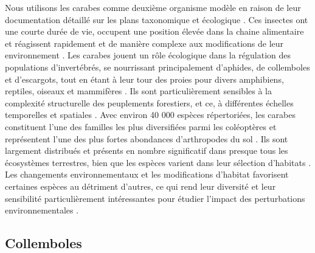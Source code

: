 Nous utilisons les carabes comme deuxième organisme modèle en raison de leur documentation détaillé sur les plans taxonomique et écologique \citep{loveiEcologyBehaviorGround1996}. 
Ces insectes ont une courte durée de vie, occupent une position élevée dans la chaine alimentaire et réagissent rapidement et de manière complexe aux modifications de leur environnement \citep{loveiEcologyBehaviorGround1996}.
Les carabes jouent un rôle écologique dans la régulation des populations d'invertébrés, se nourrissant principalement d'aphides, de collemboles et d'escargots, tout en étant à leur tour des proies pour divers amphibiens, reptiles, oiseaux et mammifères \citep{loveiEcologyBehaviorGround1996}. 
Ils sont particulièrement sensibles à la complexité structurelle des peuplements forestiers, et ce, à différentes échelles temporelles et spatiales \citep{Butterfield1995Carabidbeetle,loveiEcologyBehaviorGround1996,Niemela2007effectsforestry}.
Avec environ 40 000 espèces répertoriées, les carabes constituent l'une des familles les plus diversifiées parmi les coléoptères et représentent l'une des plus fortes abondances d'arthropodes du sol \citep{Erwin1985taxonpulse,loveiEcologyBehaviorGround1996,Rochefort2006GroundBeetle}. 
Ils sont largement distribués et présents en nombre significatif dans presque tous les écosystèmes terrestres, bien que les espèces varient dans leur sélection d'habitats \citep{loveiEcologyBehaviorGround1996,kotzeFortyYearsCarabid2011a,Larochelle2003naturalhistory}. 
Les changements environnementaux et les modifications d'habitat favorisent certaines espèces au détriment d'autres, ce qui rend leur diversité et leur sensibilité particulièrement intéressantes pour étudier l'impact des perturbations environnementales \citep{Rainio2003Groundbeetles}.

\subsection*{Collemboles}

